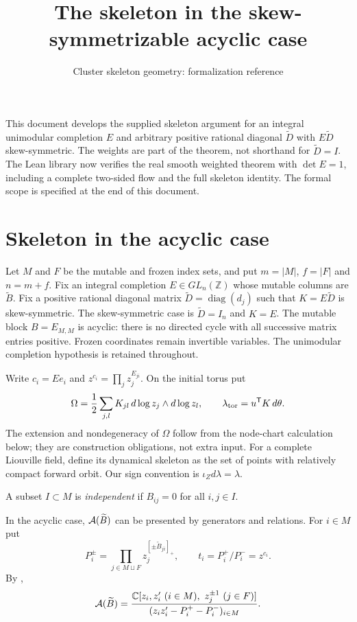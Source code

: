\documentclass[11pt,a4paper]{article}
\title{The skeleton in the skew-symmetrizable acyclic case}
\author{Cluster skeleton geometry: formalization reference}
\date{}
\newcommand{\bC}{\mathbb C}\newcommand{\bR}{\mathbb R}\newcommand{\bZ}{\mathbb Z}
\begin{document}
\maketitle
This document develops the supplied skeleton argument for an integral
unimodular completion $E$ and arbitrary positive rational diagonal
$\widetilde D$ with $E\widetilde D$ skew-symmetric. The weights are part
of the theorem, not shorthand for $\widetilde D=I$. The Lean library now verifies the real smooth weighted theorem with
$\det E=1$, including a complete two-sided flow and the full skeleton
identity. The formal scope is specified at the end of this document.
\section{Skeleton in the acyclic case}
\label{app:acyclic-skeleton}


Let $M$ and $F$ be the mutable and frozen index sets, and put
$m=|M|$, $f=|F|$ and $n=m+f$.
Fix an integral completion $E\in GL_n(\mathbb Z)$ whose mutable columns
are $\widetilde B$. Fix a positive rational diagonal matrix
$\widetilde D=\operatorname{diag}(d_j)$ such that $K=E\widetilde D$ is
skew-symmetric. The skew-symmetric case is $\widetilde D=I_n$ and $K=E$.
The mutable block $B=E_{M,M}$ is acyclic: there is no directed cycle with
all successive matrix entries positive. Frozen coordinates remain invertible
variables. The unimodular completion hypothesis is retained throughout.

Write $c_i=Ee_i$ and $z^{c_i}=\prod_j z_j^{E_{ji}}$.
On the initial torus put
\[
 \Omega=\frac12\sum_{j,l}K_{jl}\,d\log z_j\wedge d\log z_l,
 \qquad \lambda_{\rm tor}=u^{\mathsf T}K\,d\theta.
\]
The extension and nondegeneracy of $\Omega$ follow from the node-chart
calculation below; they are construction obligations, not extra input.
For a complete Liouville field, define its dynamical skeleton as the set
of points with relatively compact forward orbit. Our sign convention is
$\iota_Zd\lambda=\lambda$.

A subset $I\subset M$ is \emph{independent} if $B_{ij}=0$ for all $i,j\in I$. 








In the acyclic case,  $\mathcal A(\widetilde B)$ can be presented by generators and relations.
For $i\in M$ put
\[
 P_i^\pm=\prod_{j\in M\sqcup F}z_j^{[\pm\widetilde B_{ji}]_+},\qquad t_i=P_i^+/P_i^-=z^{c_i}.
\]
By \cite[Corollary~1.21]{BFZ-III},
\begin{equation}\label{eq:acyclic-exchange-model}
 \sA(\widetilde B)=
 \frac{\bC[z_i,z_i'\ (i\in M),\ z_j^{\pm1}\ (j\in F)]}
 {(z_i z_i'-P_i^+-P_i^-)_{i\in M}} .
\end{equation}
\end{document}
